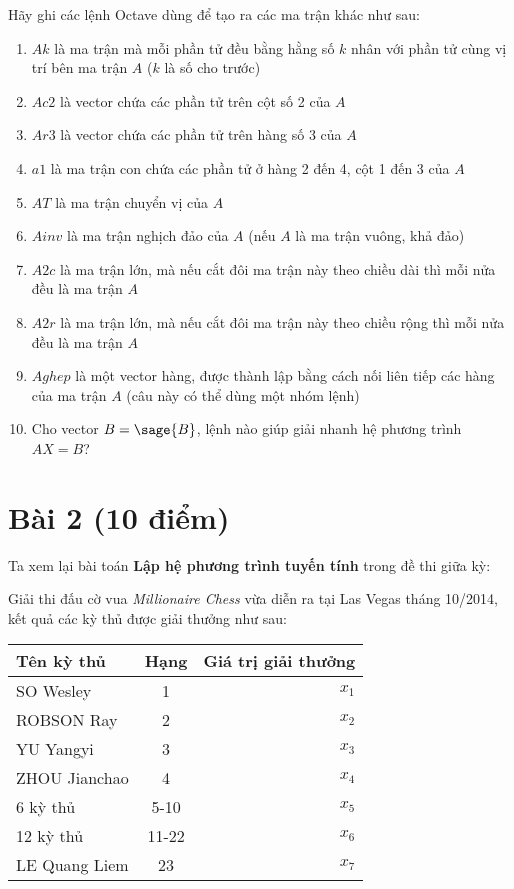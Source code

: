 \documentclass[12pt]{article}
\begin{document}
Hãy ghi các lệnh Octave dùng để tạo ra các ma trận khác như sau:
\begin{enumerate}
 \item $Ak$ là ma trận mà mỗi phần tử đều bằng hằng số $k$ nhân với phần tử cùng vị trí bên ma trận $A$ ($k$ là số cho trước)
 \item $Ac2$ là vector chứa các phần tử trên cột số 2 của $A$
 \item $Ar3$ là vector chứa các phần tử trên hàng số 3 của $A$
 \item $a1$ là ma trận con chứa các phần tử ở hàng 2 đến 4, cột 1 đến 3 của $A$
 \item $AT$ là ma trận chuyển vị của $A$
 \item $Ainv$ là ma trận nghịch đảo của $A$ (nếu $A$ là ma trận vuông, khả đảo)
 \item $A2c$ là ma trận lớn, mà nếu cắt đôi ma trận này theo chiều dài thì mỗi nửa đều là ma trận $A$
 \item $A2r$ là ma trận lớn, mà nếu cắt đôi ma trận này theo chiều rộng thì mỗi nửa đều là ma trận $A$
 \item $Aghep$ là một vector hàng, được thành lập bằng cách nối liên tiếp các hàng của ma trận $A$ (câu này có thể dùng một nhóm lệnh)
 \item Cho vector $B=\sage{B}$, lệnh nào giúp giải nhanh hệ phương trình $AX=B$?
\end{enumerate}

\section{Bài 2 (10 điểm)}

Ta xem lại bài toán \textbf{Lập hệ phương trình tuyến tính} trong đề thi giữa kỳ:

Giải thi đấu cờ vua \emph{Millionaire Chess} vừa diễn ra tại Las Vegas tháng 10/2014, kết quả các kỳ thủ được giải thưởng như sau:

\begin{center}
\begin{tabular}{l|c|r}
Tên kỳ thủ & Hạng & Giá trị giải thưởng \\
\hline
SO Wesley & 1 & $x_1$ \\%
ROBSON Ray & 2 & $x_2$ \\%
YU Yangyi & 3 & $x_3$ \\%
ZHOU Jianchao & 4 & $x_4$ \\%
6 kỳ thủ & 5-10 & $x_5$ \\%
12 kỳ thủ & 11-22 & $x_6$ \\%
LE Quang Liem & 23 & $x_7$ \\%
\end{tabular}
\end{center}
\end{document}
